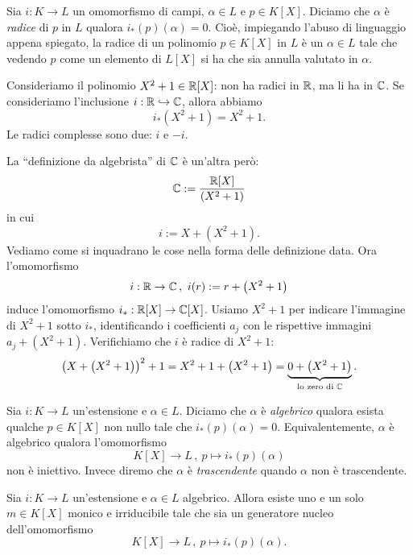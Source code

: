 \begin{defi}
Sia \(i : K \to L\) un omomorfismo di campi, \(\alpha \in L\) e \(p \in K[X]\). Diciamo che \(\alpha\) è {\em radice} di \(p\) in \(L\) qualora \(i_\ast (p)(\alpha) = 0\). Cioè, impiegando l'abuso di linguaggio appena spiegato, la radice di un polinomio \(p \in K[X]\) in \(L\) è un \(\alpha \in L\) tale che vedendo \(p\) come un elemento di \(L[X]\) si ha che sia annulla valutato in \(\alpha\).
\end{defi}

\begin{esem}
Consideriamo il polinomio \(X^2+1 \in \mathbb{R}[X]\): non ha radici in \(\mathbb{R}\), ma li ha in \(\mathbb{C}\). Se consideriamo l'inclusione \(i : \mathbb{R} \hookrightarrow \mathbb{C}\), allora abbiamo
\[i_\ast \left(X^2+1\right) = X^2+1 .\]
Le radici complesse sono due: \(i\) e \(-i\).
\end{esem}

\begin{esem}\label{esem:AlgebristaC}
La \enquote{definizione da algebrista} di \(\mathbb{C}\) è un'altra però:
\[\mathbb{C} := \frac{\mathbb{R}[X]}{\left(X^2+1\right)}\]
in cui
\[i := X + \left(X^2+1\right) .\]
Vediamo come si inquadrano le cose nella forma delle definizione data. Ora l'omomorfismo
\[i : \mathbb{R} \to \mathbb{C}\,,\ i(r) := r + \left(X^2+1\right) \]
induce l'omomorfismo \(i_\ast : \mathbb{R}[X] \to \mathbb{C}[X]\). Usiamo \(X^2+1\) per indicare l'immagine di \(X^2+1\) sotto \(i_\ast\), identificando i coefficienti \(a_j\) con le rispettive immagini \(a_j + \left(X^2+1\right)\). Verifichiamo che \(i\) è radice di \(X^2+1\):
\[\left(X + \left(X^2+1\right)\right)^2 +1 = X^2 + 1 + \left(X^2+1\right) = \underbrace{0 + \left(X^2+1\right)}_{\text{lo zero di } \C} .\]
\end{esem}

\begin{defi}
Sia \(i : K \to L\) un'estensione e \(\alpha \in L\). Diciamo che \(\alpha\) è {\em algebrico} qualora esista qualche \(p \in K[X]\) non nullo tale che \(i_\ast(p)(\alpha) = 0\). Equivalentemente, \(\alpha\) è algebrico qualora l'omomorfismo
\[K[X] \to L\,,\ p \mapsto i_\ast(p)(\alpha)\]
non è iniettivo. Invece diremo che \(\alpha\) è {\em trascendente} quando \(\alpha\) non è trascendente.
\end{defi}

\begin{prop}
Sia \(i : K \to L\) un'estensione e \(\alpha \in L\) algebrico. Allora esiste uno e un solo \(m \in K[X]\) monico e irriducibile tale che sia un generatore nucleo dell'omomorfismo
\[K[X] \to L\,,\ p \mapsto i_\ast(p)(\alpha) .\]
\end{prop}

